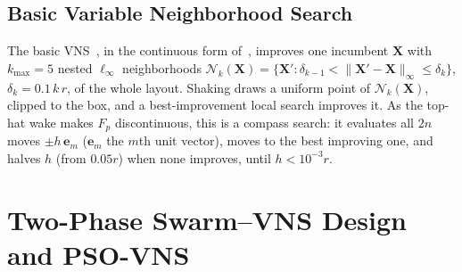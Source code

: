 \subsection{Basic Variable Neighborhood Search}
\label{sec:vns}
The basic VNS~\cite{Mladenovic1997,Hansen2001}, in the continuous form of~\cite{Mladenovic2008}, improves one incumbent $\mathbf X$ with $k_{\max}=5$ nested $\ell_\infty$ neighborhoods $\mathcal N_k(\mathbf X)=\{\mathbf X':\delta_{k-1}<\lVert \mathbf X'-\mathbf X\rVert_\infty\le\delta_k\}$, $\delta_k=0.1\,k\,r$, of the whole layout. Shaking draws a uniform point of $\mathcal N_k(\mathbf X)$, clipped to the box, and a best-improvement local search improves it. As the top-hat wake makes $F_p$ discontinuous, this is a compass search: it evaluates all $2n$ moves $\pm h\,\mathbf e_m$ ($\mathbf e_m$ the $m$th unit vector), moves to the best improving one, and halves $h$ (from $0.05r$) when none improves, until $h<10^{-3}r$.

\section{Two-Phase Swarm--VNS Design and PSO-VNS}
\label{sec:hybrid}

